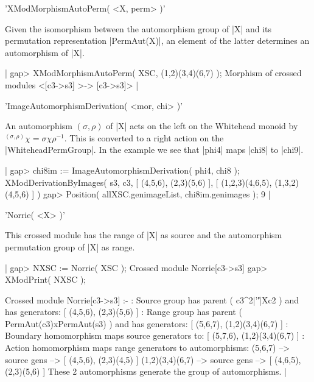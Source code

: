 %

'XModMorphismAutoPerm( <X, perm> )'

Given the  isomorphism between the automorphism group  of |X|  and its
permutation representation  |PermAut(X)|, an  element  of  the  latter
determines an automorphism of |X|.

|    gap> XModMorphismAutoPerm( XSC, (1,2)(3,4)(6,7) );
    Morphism of crossed modules <[c3->s3] >-> [c3->s3]>  |

%

'ImageAutomorphismDerivation( <mor, chi> )'

An automorphism $( \sigma,  \rho )$ of  |X| acts on   the left on  the
Whitehead   monoid  by   $\mbox{}^{(\sigma,\rho)}\chi   =  \sigma \chi
\rho^{-1}$.  This   is   converted  to    a   right action    on   the
|WhiteheadPermGroup|.  In the  example we see  that |phi4| maps |chi8|
to |chi9|.

|    gap> chi8im := ImageAutomorphismDerivation( phi4, chi8 );
    XModDerivationByImages( s3, c3, [ (4,5,6), (2,3)(5,6) ], 
       [ (1,2,3)(4,6,5), (1,3,2)(4,5,6) ] )
    gap> Position( allXSC.genimageList, chi8im.genimages );
    9  |

%

'Norrie( <X> )'

This   crossed  module has  the   range  of  |X|   as  source and  the
automorphism permutation group of |X| as range.

|    gap> NXSC := Norrie( XSC );
    Crossed module Norrie[c3->s3]
    gap> XModPrint( NXSC );

    Crossed module Norrie[c3->s3] :- 
    : Source group has parent ( c3^2|'\|'|Xc2 ) and has generators:
      [ (4,5,6), (2,3)(5,6) ]
    : Range group has parent ( PermAut(c3)xPermAut(s3) ) and has
        generators: [ (5,6,7), (1,2)(3,4)(6,7) ]
    : Boundary homomorphism maps source generators to:
      [ (5,7,6), (1,2)(3,4)(6,7) ]
    : Action homomorphism maps range generators to automorphisms:
      (5,6,7) --> { source gens --> [ (4,5,6), (2,3)(4,5) ] }
      (1,2)(3,4)(6,7) --> { source gens --> [ (4,6,5), (2,3)(5,6) ] }
      These 2 automorphisms generate the group of automorphisms.  |

